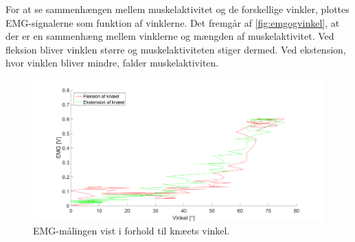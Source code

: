 \noindent
For at se sammenhængen mellem muskelaktivitet og de forskellige vinkler, plottes EMG-signalerne som funktion af vinklerne. Det fremgår af \autoref{fig:emgogvinkel}, at der er en sammenhæng mellem vinklerne og mængden af muskelaktivitet. Ved fleksion bliver vinklen større og muskelaktiviteten stiger dermed. Ved ekstension, hvor vinklen bliver mindre, falder muskelaktiviten.

\begin{figure}[H]
	\centering
	\includegraphics[width=1\textwidth]{figures/Pilotforsoeg/emg_vinkler}
	\caption{EMG-målingen vist i forhold til knæets vinkel.}
	\label{fig:emgogvinkel}
\end{figure}



%
%
% 
